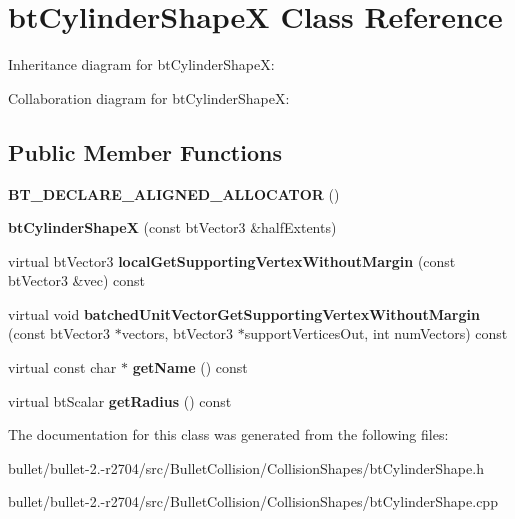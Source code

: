 \hypertarget{classbt_cylinder_shape_x}{\section{bt\+Cylinder\+Shape\+X Class Reference}
\label{classbt_cylinder_shape_x}
}


Inheritance diagram for bt\+Cylinder\+Shape\+X\+:


Collaboration diagram for bt\+Cylinder\+Shape\+X\+:
\subsection*{Public Member Functions}
\begin{DoxyCompactItemize}
\item 
\hypertarget{classbt_cylinder_shape_x_a525650ca293449c315eda46c20422245}{{\bfseries B\+T\+\_\+\+D\+E\+C\+L\+A\+R\+E\+\_\+\+A\+L\+I\+G\+N\+E\+D\+\_\+\+A\+L\+L\+O\+C\+A\+T\+O\+R} ()}\label{classbt_cylinder_shape_x_a525650ca293449c315eda46c20422245}

\item 
\hypertarget{classbt_cylinder_shape_x_a174f4e94e9d0424b82c43ea186273c21}{{\bfseries bt\+Cylinder\+Shape\+X} (const bt\+Vector3 \&half\+Extents)}\label{classbt_cylinder_shape_x_a174f4e94e9d0424b82c43ea186273c21}

\item 
\hypertarget{classbt_cylinder_shape_x_a31f498829147b91f30a819231d74bf8e}{virtual bt\+Vector3 {\bfseries local\+Get\+Supporting\+Vertex\+Without\+Margin} (const bt\+Vector3 \&vec) const }\label{classbt_cylinder_shape_x_a31f498829147b91f30a819231d74bf8e}

\item 
\hypertarget{classbt_cylinder_shape_x_ae41d6f45425f30fee5a21b6047dd86b3}{virtual void {\bfseries batched\+Unit\+Vector\+Get\+Supporting\+Vertex\+Without\+Margin} (const bt\+Vector3 $\ast$vectors, bt\+Vector3 $\ast$support\+Vertices\+Out, int num\+Vectors) const }\label{classbt_cylinder_shape_x_ae41d6f45425f30fee5a21b6047dd86b3}

\item 
\hypertarget{classbt_cylinder_shape_x_a02a865493fa245630307ac64e48fadaf}{virtual const char $\ast$ {\bfseries get\+Name} () const }\label{classbt_cylinder_shape_x_a02a865493fa245630307ac64e48fadaf}

\item 
\hypertarget{classbt_cylinder_shape_x_a1bcf6289628e311281f44312a997b84d}{virtual bt\+Scalar {\bfseries get\+Radius} () const }\label{classbt_cylinder_shape_x_a1bcf6289628e311281f44312a997b84d}

\end{DoxyCompactItemize}


The documentation for this class was generated from the following files\+:\begin{DoxyCompactItemize}
\item 
bullet/bullet-\/2.-\/r2704/src/\+Bullet\+Collision/\+Collision\+Shapes/bt\+Cylinder\+Shape.\+h\item 
bullet/bullet-\/2.-\/r2704/src/\+Bullet\+Collision/\+Collision\+Shapes/bt\+Cylinder\+Shape.\+cpp\end{DoxyCompactItemize}
